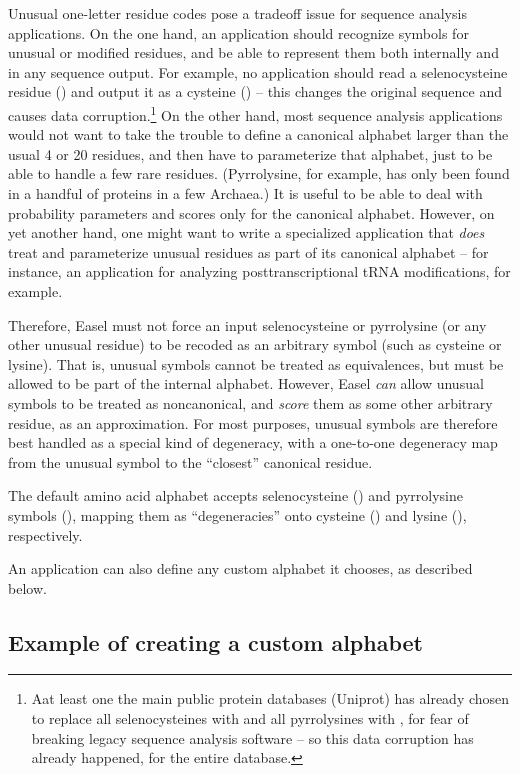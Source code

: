 Unusual one-letter residue codes pose a tradeoff issue for sequence
analysis applications. On the one hand, an application should
recognize symbols for unusual or modified residues, and be able to
represent them both internally and in any sequence output. For
example, no application should read a selenocysteine residue
() and output it as a cysteine () -- this changes
the original sequence and causes data corruption.\footnote{Aat least
one the main public protein databases (Uniprot) has already chosen to
replace all selenocysteines with  and all pyrrolysines with
, for fear of breaking legacy sequence analysis software --
so this data corruption has already happened, for the entire
database.}  On the other hand, most sequence analysis applications
would not want to take the trouble to define a canonical alphabet
larger than the usual 4 or 20 residues, and then have to parameterize
that alphabet, just to be able to handle a few rare
residues. (Pyrrolysine, for example, has only been found in a handful
of proteins in a few Archaea.) It is useful to be able to deal with
probability parameters and scores only for the canonical
alphabet. However, on yet another hand, one might want to write a
specialized application that \emph{does} treat and parameterize
unusual residues as part of its canonical alphabet -- for instance, an
application for analyzing posttranscriptional tRNA modifications, for
example.

Therefore, Easel must not force an input selenocysteine or pyrrolysine
(or any other unusual residue) to be recoded as an arbitrary symbol
(such as cysteine or lysine). That is, unusual symbols cannot be
treated as equivalences, but must be allowed to be part of the
internal alphabet.  However, Easel \emph{can} allow unusual symbols to
be treated as noncanonical, and \emph{score} them as some other
arbitrary residue, as an approximation. For most purposes, unusual
symbols are therefore best handled as a special kind of degeneracy,
with a one-to-one degeneracy map from the unusual symbol to the
``closest'' canonical residue.

The default amino acid alphabet accepts selenocysteine () and
pyrrolysine symbols (), mapping them as ``degeneracies'' onto
cysteine () and lysine (), respectively.

An application can also define any custom alphabet it chooses, as
described below.


\subsection{Example of creating a custom alphabet}

